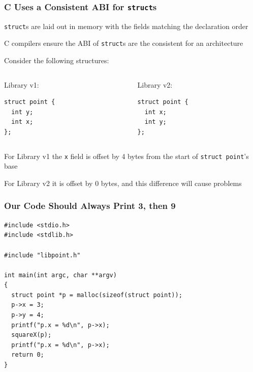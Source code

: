 \documentclass[aspectratio=169]{beamer}
\begin{document}
  \begin{frame}[fragile]
    \frametitle{C Uses a Consistent ABI for \texttt{struct}s}

    \texttt{struct}s are laid out in memory with the fields matching the
    declaration order

    \hspace{1em} C compilers ensure the ABI of \texttt{struct}s are the
    consistent for an architecture

    \vspace{2em}

    Consider the following structures:

    \vspace{1em}

    \begin{columns}
      \begin{column}{0.4\textwidth}
        Library v1:
        \begin{lstlisting}[basicstyle=\small\ttfamily]
struct point {
  int y;
  int x;
};
        \end{lstlisting}
      \end{column}
      \begin{column}{0.4\textwidth}
        Library v2:
        \begin{lstlisting}[basicstyle=\small\ttfamily]
struct point {
  int x;
  int y;
};
        \end{lstlisting}
      \end{column}
    \end{columns}

    \vspace{1em}

    For Library v1 the \texttt{x} field is offset by 4 bytes from the start of
    \texttt{struct point}'s base

    \hspace{1em} For Library v2 it is offset by 0 bytes, and this difference
    will cause problems
  \end{frame}

  \begin{frame}[fragile]
    \frametitle{Our Code Should Always Print 3, then 9}

    \begin{lstlisting}[basicstyle=\small\ttfamily]
#include <stdio.h>
#include <stdlib.h>

#include "libpoint.h"

int main(int argc, char **argv)
{
  struct point *p = malloc(sizeof(struct point));
  p->x = 3;
  p->y = 4;
  printf("p.x = %d\n", p->x);
  squareX(p);
  printf("p.x = %d\n", p->x);
  return 0;
}
    \end{lstlisting}

  \end{frame}
\end{document}

